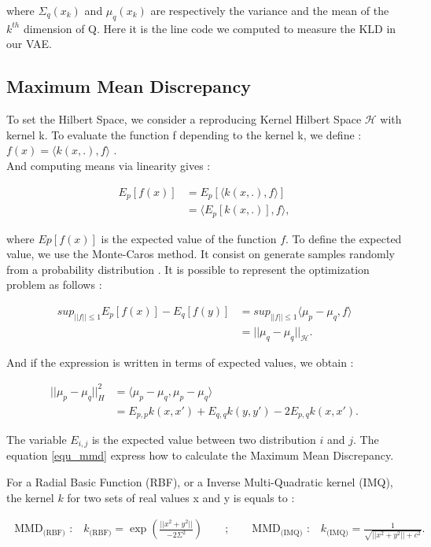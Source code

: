 \documentclass[11pt, english]{article}
\begin{document}
where $\Sigma_q(x_k)$ and $\mu_q(x_k)$ are respectively the variance and the mean of the $k^{th}$ dimension of Q. 
Here it is the line code we computed to measure the KLD in our VAE.  

\subsection{Maximum Mean Discrepancy}
To set the Hilbert Space, we consider a reproducing Kernel Hilbert Space $\mathcal{H}$ with kernel k. To evaluate the function f depending to the kernel k, we define : $f(x) = \langle {k(x,.),f} \rangle $ .\\
And computing means via linearity gives :

\begin{align}
    E_{p} [f(x)] &= E_p[\langle k(x,.), f\rangle ]  \\
    &= \langle E_p[k(x,.)],f \rangle ,
\end{align}

where $Ep[f(x)]$ is the expected value of the function $f$. To define the expected value, we use the Monte-Caros method. It consist on generate samples randomly from a probability distribution \cite{monte_carlo_method}. 
It is possible to represent the optimization problem as follows : 

\begin{align}
    sup_{||f|| \leq 1} E_p[f(x)] - E_q[f(y)] &= sup_{||f|| \leq 1} \langle \mu_p -\mu_q , f \rangle \\
    &= ||\mu_q - \mu_q||_\mathcal{H}.
\end{align}

And if the expression is written in terms of expected values, we obtain :

\begin{align}
|| \mu_p - \mu_q||^2_H  &= \langle \mu_p - \mu_q, \mu_p - \mu_q \rangle \\
&= E_{p,p}k(x,x') + E_{q,q}k(y,y') - 2E_{p,q}k(x,x') .
\label{equ_mmd}
\end{align}

The variable $E_{i,j}$ is the expected value between two distribution $i$ and $j$. 
The equation \ref{equ_mmd} express how to calculate the Maximum Mean Discrepancy. 

For a Radial Basic Function (RBF), or a Inverse Multi-Quadratic kernel (IMQ), the kernel $k$ for two sets of real values x and y is equals to : 

\begin{align}
\text{ MMD$_{\text{(RBF)}}$ :} \quad 
    k_{\text{(RBF)}} = \exp \left( \frac{ ||x^2 + y^2||}{- 2 \Sigma^2} \right) \qquad; \qquad
\text{MMD$_{\text{(IMQ)}}$ :} \quad
    k_{\text{(IMQ)}} = \frac{ 1 }{ \sqrt{ ||x^2 + y^2|| + c^2} }. \qquad
\end{align}
 
\end{document}
